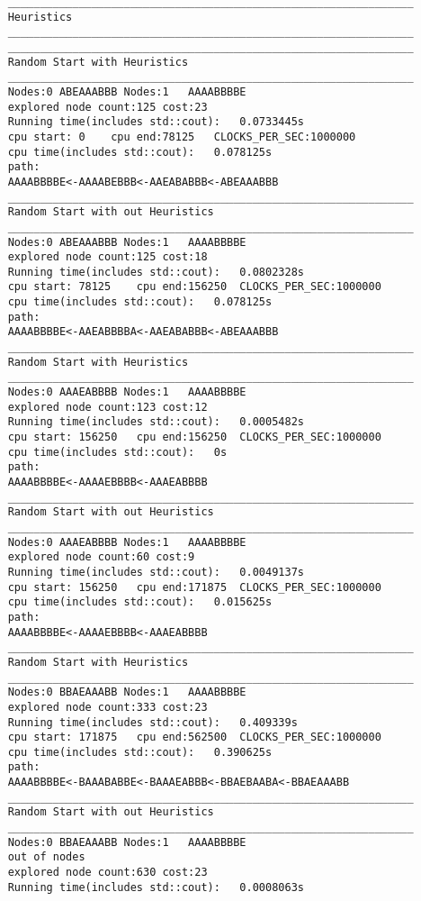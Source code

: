 \documentclass[12pt]{article}
\begin{document}
\begin{lstlisting}
	_______________________________________________________________
	Heuristics
	_______________________________________________________________
	_______________________________________________________________
	Random Start with Heuristics
	_______________________________________________________________
	Nodes:0	ABEAAABBB Nodes:1	AAAABBBBE
	explored node count:125 cost:23
	Running time(includes std::cout):	0.0733445s
	cpu start: 0	cpu end:78125	CLOCKS_PER_SEC:1000000
	cpu time(includes std::cout):	0.078125s
	path:
	AAAABBBBE<-AAAABEBBB<-AAEABABBB<-ABEAAABBB
	_______________________________________________________________
	Random Start with out Heuristics
	_______________________________________________________________
	Nodes:0	ABEAAABBB Nodes:1	AAAABBBBE
	explored node count:125 cost:18
	Running time(includes std::cout):	0.0802328s
	cpu start: 78125	cpu end:156250	CLOCKS_PER_SEC:1000000
	cpu time(includes std::cout):	0.078125s
	path:
	AAAABBBBE<-AAEABBBBA<-AAEABABBB<-ABEAAABBB
	_______________________________________________________________
	Random Start with Heuristics
	_______________________________________________________________
	Nodes:0	AAAEABBBB Nodes:1	AAAABBBBE
	explored node count:123 cost:12
	Running time(includes std::cout):	0.0005482s
	cpu start: 156250	cpu end:156250	CLOCKS_PER_SEC:1000000
	cpu time(includes std::cout):	0s
	path:
	AAAABBBBE<-AAAAEBBBB<-AAAEABBBB
	_______________________________________________________________
	Random Start with out Heuristics
	_______________________________________________________________
	Nodes:0	AAAEABBBB Nodes:1	AAAABBBBE
	explored node count:60 cost:9
	Running time(includes std::cout):	0.0049137s
	cpu start: 156250	cpu end:171875	CLOCKS_PER_SEC:1000000
	cpu time(includes std::cout):	0.015625s
	path:
	AAAABBBBE<-AAAAEBBBB<-AAAEABBBB
	_______________________________________________________________
	Random Start with Heuristics
	_______________________________________________________________
	Nodes:0	BBAEAAABB Nodes:1	AAAABBBBE
	explored node count:333 cost:23
	Running time(includes std::cout):	0.409339s
	cpu start: 171875	cpu end:562500	CLOCKS_PER_SEC:1000000
	cpu time(includes std::cout):	0.390625s
	path:
	AAAABBBBE<-BAAABABBE<-BAAAEABBB<-BBAEBAABA<-BBAEAAABB
	_______________________________________________________________
	Random Start with out Heuristics
	_______________________________________________________________
	Nodes:0	BBAEAAABB Nodes:1	AAAABBBBE
	out of nodes
	explored node count:630 cost:23
	Running time(includes std::cout):	0.0008063s

\end{lstlisting}
\end{document}

